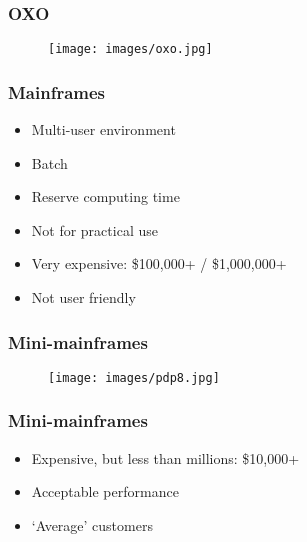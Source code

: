 \documentclass[aspectratio=43]{uva-inf-presentation}
\begin{document}

\begin{frame}
\frametitle{OXO}

\begin{figure}
\texttt{[image: images/oxo.jpg]}
\end{figure}

\end{frame}


\begin{frame}
\frametitle{Mainframes}

\begin{itemize}
\item Multi-user environment
\item Batch
\item Reserve computing time
\item Not for practical use
\item Very expensive: \$100,000+ / \$1,000,000+
\item Not user friendly
\end{itemize}

\end{frame}


\begin{frame}
\frametitle{Mini-mainframes}

\begin{figure}
\texttt{[image: images/pdp8.jpg]}
\end{figure}

\end{frame}


\begin{frame}
\frametitle{Mini-mainframes}

\begin{itemize}
\item Expensive, but less than millions: \$10,000+
\item Acceptable performance
\item `Average' customers
\end{itemize}

\end{frame}

\end{document}
